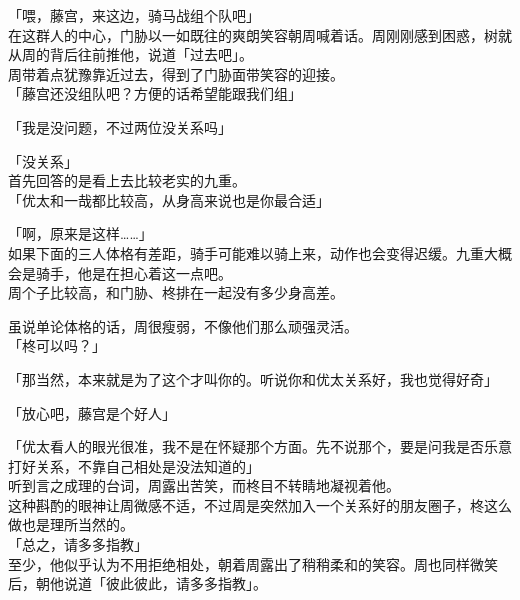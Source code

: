 「喂，藤宫，来这边，骑马战组个队吧」\\

在这群人的中心，门胁以一如既往的爽朗笑容朝周喊着话。周刚刚感到困惑，树就从周的背后往前推他，说道「过去吧」。\\

周带着点犹豫靠近过去，得到了门胁面带笑容的迎接。\\

「藤宫还没组队吧？方便的话希望能跟我们组」

「我是没问题，不过两位没关系吗」

「没关系」\\

首先回答的是看上去比较老实的九重。\\

「优太和一哉都比较高，从身高来说也是你最合适」

「啊，原来是这样……」\\

如果下面的三人体格有差距，骑手可能难以骑上来，动作也会变得迟缓。九重大概会是骑手，他是在担心着这一点吧。\\

周个子比较高，和门胁、柊排在一起没有多少身高差。

虽说单论体格的话，周很瘦弱，不像他们那么顽强灵活。\\

「柊可以吗？」

「那当然，本来就是为了这个才叫你的。听说你和优太关系好，我也觉得好奇」

「放心吧，藤宫是个好人」

「优太看人的眼光很准，我不是在怀疑那个方面。先不说那个，要是问我是否乐意打好关系，不靠自己相处是没法知道的」\\

听到言之成理的台词，周露出苦笑，而柊目不转睛地凝视着他。\\

这种斟酌的眼神让周微感不适，不过周是突然加入一个关系好的朋友圈子，柊这么做也是理所当然的。\\

「总之，请多多指教」\\

至少，他似乎认为不用拒绝相处，朝着周露出了稍稍柔和的笑容。周也同样微笑后，朝他说道「彼此彼此，请多多指教」。
